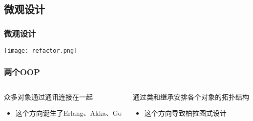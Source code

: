\documentclass[UTF8,lualatex]{ctexbeamer}
\begin{document}
\subsection{微观设计}

\begin{frame}
    \frametitle{微观设计}
    \begin{center}
        \texttt{[image: refactor.png]}
    \end{center}
\end{frame}

\begin{frame}
    \frametitle{两个OOP}
    \begin{columns}[t]
        \begin{column}{0.45\textwidth}
            \begin{block}{众多对象通过通讯连接在一起}
                \begin{itemize}
                    \item 这个方向诞生了Erlang、Akka、Go
                \end{itemize}
            \end{block}
        \end{column}
        \begin{column}{0.45\textwidth}
            \begin{block}{通过类和继承安排各个对象的拓扑结构}
                \begin{itemize}
                    \item 这个方向导致柏拉图式设计
                \end{itemize}
            \end{block}
        \end{column}
    \end{columns}
\end{frame}
\end{document}
